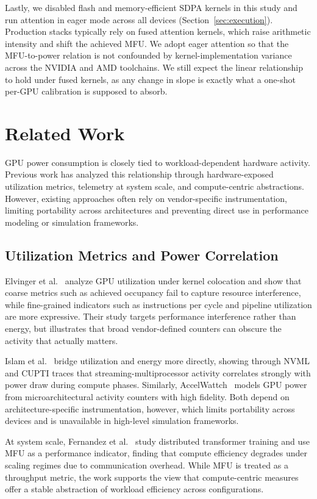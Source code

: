 \documentclass[10pt,conference,letterpaper]{IEEEtran}
\begin{document}
Lastly, we disabled flash and memory-efficient SDPA kernels in this study and run attention in eager mode across all devices (Section~\ref{sec:execution}).
Production stacks typically rely on fused attention kernels, which raise arithmetic intensity and shift the achieved MFU.
We adopt eager attention so that the MFU-to-power relation is not confounded by kernel-implementation variance across the NVIDIA and AMD toolchains.
We still expect the linear relationship to hold under fused kernels, as any change in slope is exactly what a one-shot per-GPU calibration is supposed to absorb.

\section{Related Work}\label{related work}
GPU power consumption is closely tied to workload-dependent hardware activity.
Previous work has analyzed this relationship through hardware-exposed utilization metrics, telemetry at system scale, and compute-centric abstractions.
However, existing approaches often rely on vendor-specific instrumentation, limiting portability across architectures and preventing direct use in performance modeling or simulation frameworks.

\subsection{Utilization Metrics and Power Correlation}
Elvinger et al.~\cite{elvinger-2025} analyze GPU utilization under kernel colocation and show that coarse metrics such as achieved occupancy fail to capture resource interference, while fine-grained indicators such as instructions per cycle and pipeline utilization are more expressive.
Their study targets performance interference rather than energy, but illustrates that broad vendor-defined counters can obscure the activity that actually matters.

Islam et al.~\cite{islam-2024} bridge utilization and energy more directly, showing through NVML and CUPTI traces that streaming-multiprocessor activity correlates strongly with power draw during compute phases.
Similarly, AccelWattch~\cite{kandiah2021accelwattch} models GPU power from microarchitectural activity counters with high fidelity.
Both depend on architecture-specific instrumentation, however, which limits portability across devices and is unavailable in high-level simulation frameworks.

At system scale, Fernandez et al.~\cite{fernandez-2024} study distributed transformer training and use MFU as a performance indicator, finding that compute efficiency degrades under scaling regimes due to communication overhead.
While MFU is treated as a throughput metric, the work supports the view that compute-centric measures offer a stable abstraction of workload efficiency across configurations.
\end{document}
